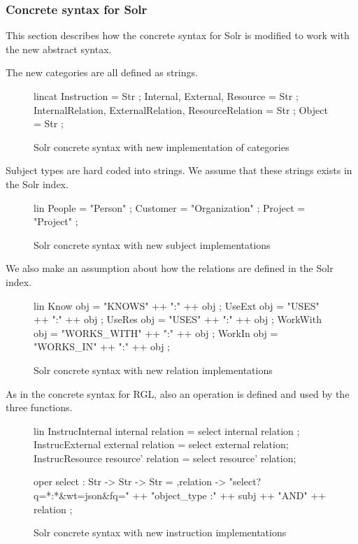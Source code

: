 \subsubsection{Concrete syntax for Solr}
This section describes how the concrete syntax for Solr is modified to work with the new abstract syntax.

The new categories are all defined as strings.

\begin{figure}[H]
\begin{code}
lincat
  Instruction = Str ;
  Internal, External, Resource = Str ;
  InternalRelation, ExternalRelation, ResourceRelation = Str ;
  Object = Str ;
\end{code}
\caption{Solr concrete syntax with new implementation of categories\label{fig:solr-categories-impl}}
\end{figure}

Subject types are hard coded into strings. We assume that these strings exists in the Solr index.

\begin{figure}[H]
\begin{code}
lin
  People = "Person" ;
  Customer = "Organization" ;
  Project = "Project" ;
\end{code}
\caption{Solr concrete syntax with new subject implementations\label{fig:solr-function-implementation}}
\end{figure}

We also make an assumption about how the relations are defined in the Solr index. 

\begin{figure}[H]
\begin{code}
lin
  Know obj = "KNOWS" ++ ":" ++ obj ;
  UseExt obj = "USES" ++ ":" ++ obj ;
  UseRes obj = "USES" ++ ":" ++ obj ;
  WorkWith obj = "WORKS_WITH" ++ ":" ++ obj ;
  WorkIn obj = "WORKS_IN" ++ ":" ++ obj ;
\end{code}
\caption{Solr concrete syntax with new relation implementations\label{fig:solr-new-relations}}
\end{figure}

As in the concrete syntax for RGL, also an operation is defined and used by the three functions.

\begin{figure}[H]
\begin{code}
lin
  InstrucInternal internal relation = select internal relation ;
  InstrucExternal external relation = select external relation;
  InstrucResource resource' relation = select resource' relation;

oper
  select : Str -> Str -> Str = \subj,relation -> 
                    "select?q=*:*&wt=json&fq=" ++ "object_type :" 
                    ++ subj ++ "AND" ++ relation ;
\end{code}
\caption{Solr concrete syntax with new instruction implementations\label{fig:solr-new-instructions}}
\end{figure}

